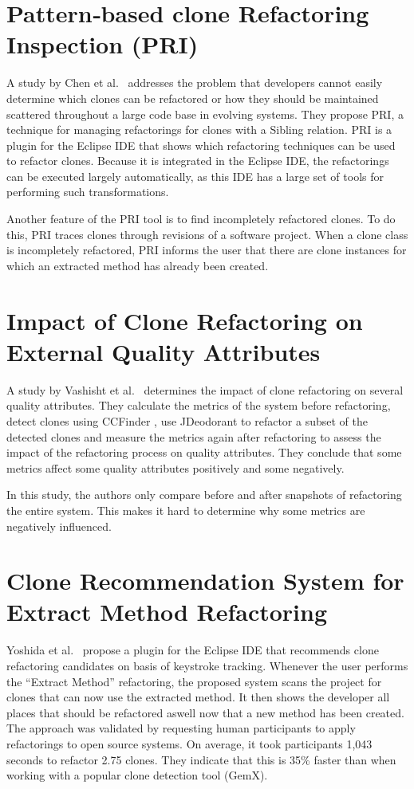 \section{Pattern‐based clone Refactoring Inspection (PRI)}
A study by Chen et al.~\cite{chen2018clone} addresses the problem that developers cannot easily determine which clones can be refactored or how they should be maintained scattered throughout a large code base in evolving systems. They propose PRI, a technique for managing refactorings for clones with a Sibling relation. PRI is a plugin for the Eclipse IDE that shows which refactoring techniques can be used to refactor clones. Because it is integrated in the Eclipse IDE, the refactorings can be executed largely automatically, as this IDE has a large set of tools for performing such transformations.

Another feature of the PRI tool is to find incompletely refactored clones. To do this, PRI traces clones through revisions of a software project. When a clone class is incompletely refactored, PRI informs the user that there are clone instances for which an extracted method has already been created.

\section{Impact of Clone Refactoring on External Quality Attributes}
A study by Vashisht et al.~\cite{vashisht2018impact} determines the impact of clone refactoring on several quality attributes. They calculate the metrics of the system before refactoring, detect clones using CCFinder \cite{kamiya2002ccfinder}, use JDeodorant to refactor a subset of the detected clones \cite{mazinanian2016jdeodorant} and measure the metrics again after refactoring to assess the impact of the refactoring process on quality attributes. They conclude that some metrics affect some quality attributes positively and some negatively.

In this study, the authors only compare before and after snapshots of refactoring the entire system. This makes it hard to determine why some metrics are negatively influenced.

\section{Clone Recommendation System for Extract Method Refactoring}
Yoshida et al.~\cite{yoshida2019proactive} propose a plugin for the Eclipse IDE that recommends clone refactoring candidates on basis of keystroke tracking. Whenever the user performs the ``Extract Method'' refactoring, the proposed system scans the project for clones that can now use the extracted method. It then shows the developer all places that should be refactored aswell now that a new method has been created. The approach was validated by requesting human participants to apply refactorings to open source systems. On average, it took participants 1,043 seconds to refactor 2.75 clones. They indicate that this is 35\% faster than when working with a popular clone detection tool (GemX).

